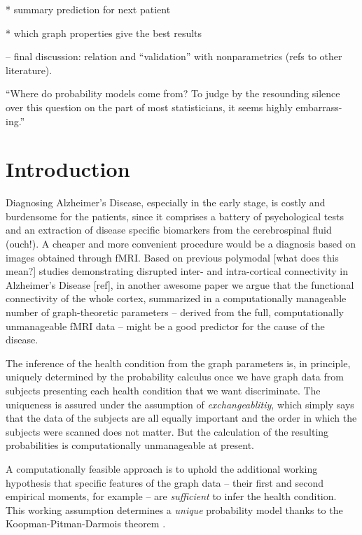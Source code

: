 \documentclass[\ifafour a4paper,12pt,\else a5paper,10pt,\fi%
onecolumn,oneside,article,%
british%
]{memoir}
\theoremstyle{remark}
\theoremstyle{innote}
\newcommand*{\citep}{\parencites}
\renewcommand*{\cites}{\parencites}
\renewcommand*{\|}{\mathpunct{|}}
\theoremstyle{plain}
\begin{document}
* summary prediction for next patient

* which graph properties give the best results


– final discussion: relation and \enquote{validation} with nonparametrics
(refs to other literature).


\enquote{Where do probability models come from? To judge by the resounding silence
over this question on the part of most statisticians, it seems highly embarrass-
ing.}  \citep{dawid1982}



\section{Introduction}
\label{sec:synopsis}


Diagnosing Alzheimer's Disease, especially in the early stage, is costly
and burdensome for the patients, since it comprises a battery of
psychological tests and an extraction of disease specific biomarkers from
the cerebrospinal fluid (ouch!). A cheaper and more convenient procedure
would be a diagnosis based on images obtained through fMRI. Based on
previous polymodal [what does this mean?] studies demonstrating disrupted
inter- and intra-cortical connectivity in Alzheimer's Disease [ref], in
another awesome paper we argue that the functional connectivity of the
whole cortex, summarized in a computationally manageable number of
graph-theoretic parameters -- derived from the full, computationally
unmanageable fMRI data -- might be a good predictor for the cause of the
disease.

The inference of the health condition from the graph parameters is, in
principle, uniquely determined by the probability calculus once we have
graph data from subjects presenting each health condition that we want
discriminate. The uniqueness is assured under the assumption of
\emph{exchangeablitiy}, which simply says that the data of the subjects are
all equally important and the order in which the subjects were scanned does
not matter. But the calculation of the resulting probabilities is
computationally unmanageable at present.

A computationally feasible approach is to uphold the additional working
hypothesis that specific features of the graph data -- their first and
second empirical moments, for example -- are \emph{sufficient} to infer the
health condition. This working assumption determines a \emph{unique}
probability model thanks to the Koopman-Pitman-Darmois theorem
\cites{koopman1936,pitman1936,darmois1935}[see
also]{hipp1974,andersen1970,denny1967,fraser1963,barankinetal1963}.
\end{document}
